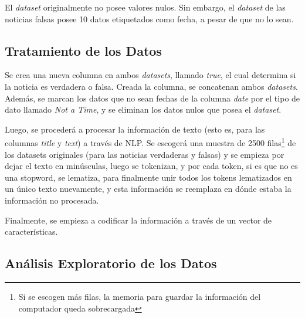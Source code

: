 {El \textit{dataset} originalmente no posee valores nulos. Sin embargo, el \textit{dataset} de las noticias falsas posee 10 datos etiquetados como fecha, a pesar de que no lo sean.


\subsection{Tratamiento de los Datos}

Se crea una nueva columna en ambos \textit{datasets}, llamado \textit{true}, el cual determina si la noticia es verdadera o falsa. Creada la columna, se concatenan ambos \textit{datasets}. Además, se marcan los datos que no sean fechas de la columna \textit{date} por el tipo de dato llamado \textit{Not a Time}, y se eliminan los datos nulos que posea el \textit{dataset}.

Luego, se procederá a procesar la información de texto (esto es, para las columnas \textit{title} y \textit{text}) a través de NLP. Se escogerá una muestra de 2500 filas\footnote{Si se escogen más filas, la memoria para guardar la información del computador queda sobrecargada} de los datasets originales (para las noticias verdaderas y falsas) y se empieza por dejar el texto en minúsculas, luego se tokenizan, y por cada token, si es que no es una stopword, se lematiza, para finalmente unir todos los tokens lematizados en un único texto nuevamente, y esta información se reemplaza en dónde estaba la información no procesada.

Finalmente, se empieza a codificar la información a través de un vector de características. 

\subsection{Análisis Exploratorio de los Datos}

\lipsum[1]
}

